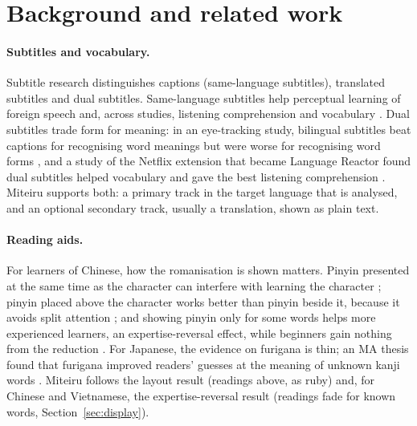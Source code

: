 ﻿\documentclass[11pt,a4paper]{article}
\begin{document}
\section{Background and related work}
\label{sec:background}

\paragraph{Subtitles and vocabulary.}
Subtitle research distinguishes captions (same-language subtitles), translated subtitles and dual subtitles. Same-language subtitles help perceptual learning of foreign speech \citep{mitterer2009foreign} and, across studies, listening comprehension and vocabulary \citep{monteroperez2013captioned}. Dual subtitles trade form for meaning: in an eye-tracking study, bilingual subtitles beat captions for recognising word meanings but were worse for recognising word forms \citep{wang2022incidental}, and a study of the Netflix extension that became Language Reactor found dual subtitles helped vocabulary and gave the best listening comprehension \citep{dizon2021netflix}. Miteiru supports both: a primary track in the target language that is analysed, and an optional secondary track, usually a translation, shown as plain text.

\paragraph{Reading aids.}
For learners of Chinese, how the romanisation is shown matters. Pinyin presented at the same time as the character can interfere with learning the character \citep{chung2003effects}; pinyin placed above the character works better than pinyin beside it, because it avoids split attention \citep{lee2011effectiveness}; and showing pinyin only for some words helps more experienced learners, an expertise-reversal effect, while beginners gain nothing from the reduction \citep{lee2011onscreen}. For Japanese, the evidence on furigana is thin; an MA thesis found that furigana improved readers' guesses at the meaning of unknown kanji words \citep{palmer2012effect}. Miteiru follows the layout result (readings above, as ruby) and, for Chinese and Vietnamese, the expertise-reversal result (readings fade for known words, Section~\ref{sec:display}).
\end{document}
